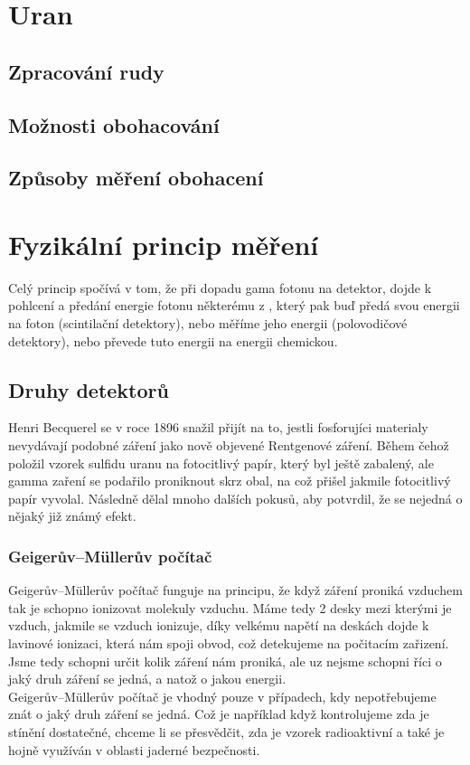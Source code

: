 \section{Uran}
\subsection{Zpracování rudy}
\subsection{Možnosti obohacování}
\subsection{Způsoby měření obohacení}

\section{Fyzikální princip měření}
Celý princip spočívá v tom, že při dopadu gama fotonu na detektor, dojde k pohlcení a předání energie fotonu některému z \e , který pak buď předá svou energii na foton (scintilační detektory), nebo měříme jeho energii (polovodičové detektory), nebo převede tuto energii na energii chemickou.
\subsection{Druhy detektorů}
Henri Becquerel se v roce 1896 snažil přijít na to, jestli fosforujíci materialy nevydávají podobné záření jako nově objevené Rentgenové záření. Během čehož položil vzorek sulfidu uranu na fotocitlivý papír, který byl ještě zabalený, ale gamma zaření se podařilo proniknout skrz obal, na což přišel jakmile fotocitlivý papír vyvolal. Následně dělal mnoho dalších pokusů, aby potvrdil, že se nejedná o nějaký již známý efekt.  \cite{Radioactivity}%

\subsubsection{Geigerův–Müllerův počítač}
Geigerův–Müllerův počítač funguje na principu, že když záření proniká vzduchem tak je schopno ionizovat molekuly vzduchu. Máme tedy 2 desky mezi kterými je vzduch, jakmile se vzduch ionizuje, díky velkému napětí na deskách dojde k lavinové ionizaci, která nám spoji obvod, což detekujeme na počitacím zařizení. Jsme tedy schopni určit kolik záření nám proniká, ale uz nejsme schopni říci o jaký druh záření se jedná, a natož o jakou energii.\\
Geigerův–Müllerův počítač je vhodný pouze v případech, kdy nepotřebujeme znát o jaký druh záření se jedná. Což je například když kontrolujeme zda je stínění dostatečné, chceme li se přesvědčit, zda je vzorek radioaktivní a také je hojně využíván v oblasti  jaderné bezpečnosti.\cite{}%
